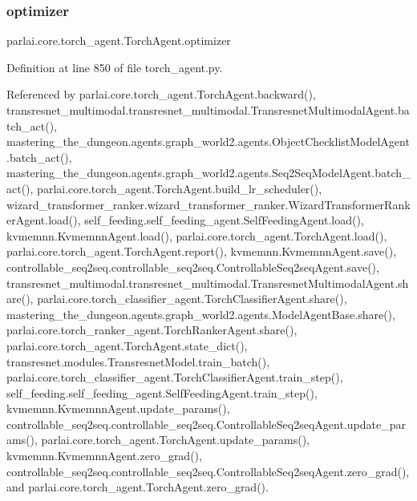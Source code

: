 \mbox{\label{classparlai_1_1core_1_1torch__agent_1_1TorchAgent_a9533344de40049bf13209739bc92199d}} 
\subsubsection{\texorpdfstring{optimizer}{optimizer}}
{\footnotesize\ttfamily parlai.\+core.\+torch\+\_\+agent.\+Torch\+Agent.\+optimizer}



Definition at line 850 of file torch\+\_\+agent.\+py.



Referenced by parlai.\+core.\+torch\+\_\+agent.\+Torch\+Agent.\+backward(), transresnet\+\_\+multimodal.\+transresnet\+\_\+multimodal.\+Transresnet\+Multimodal\+Agent.\+batch\+\_\+act(), mastering\+\_\+the\+\_\+dungeon.\+agents.\+graph\+\_\+world2.\+agents.\+Object\+Checklist\+Model\+Agent.\+batch\+\_\+act(), mastering\+\_\+the\+\_\+dungeon.\+agents.\+graph\+\_\+world2.\+agents.\+Seq2\+Seq\+Model\+Agent.\+batch\+\_\+act(), parlai.\+core.\+torch\+\_\+agent.\+Torch\+Agent.\+build\+\_\+lr\+\_\+scheduler(), wizard\+\_\+transformer\+\_\+ranker.\+wizard\+\_\+transformer\+\_\+ranker.\+Wizard\+Transformer\+Ranker\+Agent.\+load(), self\+\_\+feeding.\+self\+\_\+feeding\+\_\+agent.\+Self\+Feeding\+Agent.\+load(), kvmemnn.\+Kvmemnn\+Agent.\+load(), parlai.\+core.\+torch\+\_\+agent.\+Torch\+Agent.\+load(), parlai.\+core.\+torch\+\_\+agent.\+Torch\+Agent.\+report(), kvmemnn.\+Kvmemnn\+Agent.\+save(), controllable\+\_\+seq2seq.\+controllable\+\_\+seq2seq.\+Controllable\+Seq2seq\+Agent.\+save(), transresnet\+\_\+multimodal.\+transresnet\+\_\+multimodal.\+Transresnet\+Multimodal\+Agent.\+share(), parlai.\+core.\+torch\+\_\+classifier\+\_\+agent.\+Torch\+Classifier\+Agent.\+share(), mastering\+\_\+the\+\_\+dungeon.\+agents.\+graph\+\_\+world2.\+agents.\+Model\+Agent\+Base.\+share(), parlai.\+core.\+torch\+\_\+ranker\+\_\+agent.\+Torch\+Ranker\+Agent.\+share(), parlai.\+core.\+torch\+\_\+agent.\+Torch\+Agent.\+state\+\_\+dict(), transresnet.\+modules.\+Transresnet\+Model.\+train\+\_\+batch(), parlai.\+core.\+torch\+\_\+classifier\+\_\+agent.\+Torch\+Classifier\+Agent.\+train\+\_\+step(), self\+\_\+feeding.\+self\+\_\+feeding\+\_\+agent.\+Self\+Feeding\+Agent.\+train\+\_\+step(), kvmemnn.\+Kvmemnn\+Agent.\+update\+\_\+params(), controllable\+\_\+seq2seq.\+controllable\+\_\+seq2seq.\+Controllable\+Seq2seq\+Agent.\+update\+\_\+params(), parlai.\+core.\+torch\+\_\+agent.\+Torch\+Agent.\+update\+\_\+params(), kvmemnn.\+Kvmemnn\+Agent.\+zero\+\_\+grad(), controllable\+\_\+seq2seq.\+controllable\+\_\+seq2seq.\+Controllable\+Seq2seq\+Agent.\+zero\+\_\+grad(), and parlai.\+core.\+torch\+\_\+agent.\+Torch\+Agent.\+zero\+\_\+grad().

